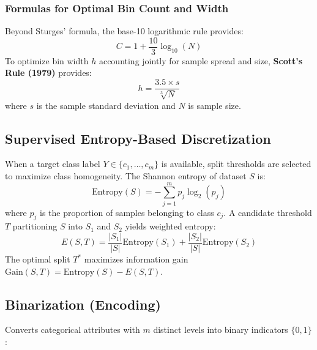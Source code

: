 \subsubsection{Formulas for Optimal Bin Count and Width}
Beyond Sturges' formula, the base-10 logarithmic rule provides:
\begin{equation}
    C = 1 + \frac{10}{3} \log_{10}(N)
\end{equation}
To optimize bin width $h$ accounting jointly for sample spread and size, \textbf{Scott's Rule (1979)} provides:
\begin{equation}
    h = \frac{3.5 \times s}{\sqrt[3]{N}}
\end{equation}
where $s$ is the sample standard deviation and $N$ is sample size.

\subsection{Supervised Entropy-Based Discretization}

When a target class label $Y \in \{c_1, \dots, c_m\}$ is available, split thresholds are selected to maximize class homogeneity.
The Shannon entropy of dataset $S$ is:
\begin{equation}
    \text{Entropy}(S) = - \sum_{j=1}^m p_j \log_2(p_j)
\end{equation}
where $p_j$ is the proportion of samples belonging to class $c_j$. A candidate threshold $T$ partitioning $S$ into $S_1$ and $S_2$ yields weighted entropy:
\begin{equation}
    E(S, T) = \frac{|S_1|}{|S|} \text{Entropy}(S_1) + \frac{|S_2|}{|S|} \text{Entropy}(S_2)
\end{equation}
The optimal split $T^*$ maximizes information gain $\text{Gain}(S, T) = \text{Entropy}(S) - E(S, T)$.

\subsection{Binarization (Encoding)}

Converts categorical attributes with $m$ distinct levels into binary indicators $\{0, 1\}$:

